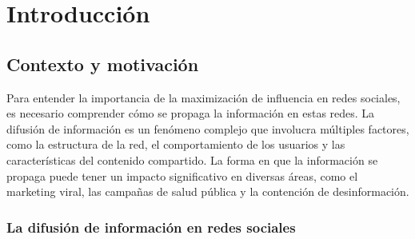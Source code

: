 \documentclass[12pt,twoside,titlepage]{report}
\begin{document}

\pagestyle{fancy}


\renewcommand{\chaptermark}[1]{\markboth{Capítulo \thechapter.\ #1}{}}

\pagestyle{fancy}
\fancyhf{}
\fancyhead[LO]{\leftmark}
\fancyhead[RO]{}
\fancyhead[RE]{\nouppercase\rightmark}
\fancyhead[LE]{}
\fancyfoot[C]{\thepage}










\chapter{Introducción} \label{chap:intro}



\pagestyle{fancy}


\setlength{\parskip}{0.75em}
\renewcommand{\baselinestretch}{1.25}
\setcounter{page}{1}




\section{Contexto y motivación} \label{sec:contexto}

Para entender la importancia de la maximización de influencia en redes sociales, es necesario comprender cómo se propaga la información en estas redes.
La difusión de información es un fenómeno complejo que involucra múltiples factores, como la estructura de la red, el comportamiento de los usuarios y las características del contenido compartido.
La forma en que la información se propaga puede tener un impacto significativo en diversas áreas, como el marketing viral, las campañas de salud pública y la contención de desinformación.

\subsection{La difusión de información en redes sociales} \label{subsec:difusion}
\end{document}
